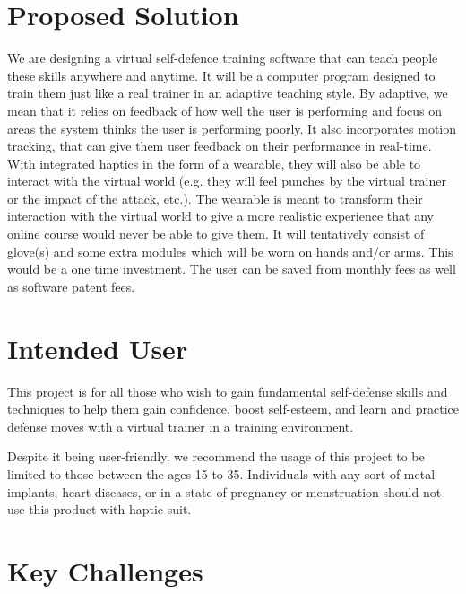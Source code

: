 \section{Proposed Solution}

We are designing a virtual self-defence training software that can teach people these skills anywhere and anytime. It will be a computer program designed to train them just like a real trainer in an adaptive teaching style. By adaptive, we mean that it relies on feedback of how well the user is performing and focus on areas the system thinks the user is performing poorly. It also incorporates motion tracking, that can give them user feedback on their performance in real-time. With integrated haptics in the form of a wearable, they will also be able to interact with the virtual world (e.g. they will feel punches by the virtual trainer or the impact of the attack, etc.). The wearable is meant to transform their interaction with the virtual world to give a more realistic experience that any online course would never be able to give them. It will tentatively consist of glove(s) and some extra modules which will be worn on hands and/or arms. This would be a one time investment. The user can be saved from monthly fees as well as software patent fees.

\section{Intended User}

This project is for all those who wish to gain fundamental self-defense skills and techniques to help them gain confidence, boost self-esteem, and learn and practice defense moves with a virtual trainer in a training environment. 

Despite it being user-friendly, we recommend the usage of this project to be limited to those between the ages 15 to 35. Individuals with any sort of metal implants, heart diseases, or in a state of pregnancy or menstruation should not use this product with haptic suit.

\section{Key Challenges}

